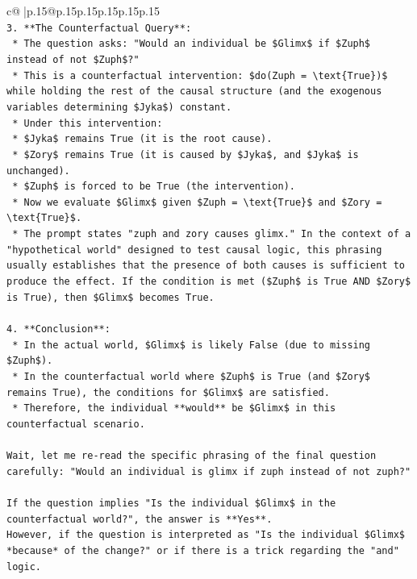 \documentclass{article}
\begin{document}
{\begin{supertabular}{c@{$\;$}|p{.15\linewidth}@{}p{.15\linewidth}p{.15\linewidth}p{.15\linewidth}p{.15\linewidth}p{.15\linewidth}}
{{{\\ 
\texttt{3.  **The Counterfactual Query**:} \\
\texttt{    *   The question asks: "Would an individual be \$Glimx\$ if \$Zuph\$ instead of not \$Zuph\$?"} \\
\texttt{    *   This is a counterfactual intervention: \$do(Zuph = \textbackslash{}text\{True\})\$ while holding the rest of the causal structure (and the exogenous variables determining \$Jyka\$) constant.} \\
\texttt{    *   Under this intervention:} \\
\texttt{        *   \$Jyka\$ remains True (it is the root cause).} \\
\texttt{        *   \$Zory\$ remains True (it is caused by \$Jyka\$, and \$Jyka\$ is unchanged).} \\
\texttt{        *   \$Zuph\$ is forced to be True (the intervention).} \\
\texttt{    *   Now we evaluate \$Glimx\$ given \$Zuph = \textbackslash{}text\{True\}\$ and \$Zory = \textbackslash{}text\{True\}\$.} \\
\texttt{    *   The prompt states "zuph and zory causes glimx." In the context of a "hypothetical world" designed to test causal logic, this phrasing usually establishes that the presence of both causes is sufficient to produce the effect. If the condition is met (\$Zuph\$ is True AND \$Zory\$ is True), then \$Glimx\$ becomes True.} \\
\\ 
\texttt{4.  **Conclusion**:} \\
\texttt{    *   In the actual world, \$Glimx\$ is likely False (due to missing \$Zuph\$).} \\
\texttt{    *   In the counterfactual world where \$Zuph\$ is True (and \$Zory\$ remains True), the conditions for \$Glimx\$ are satisfied.} \\
\texttt{    *   Therefore, the individual **would** be \$Glimx\$ in this counterfactual scenario.} \\
\\ 
\texttt{Wait, let me re{-}read the specific phrasing of the final question carefully: "Would an individual is glimx if zuph instead of not zuph?"} \\
\\ 
\texttt{If the question implies "Is the individual \$Glimx\$ in the counterfactual world?", the answer is **Yes**.} \\
\texttt{However, if the question is interpreted as "Is the individual \$Glimx\$ *because* of the change?" or if there is a trick regarding the "and" logic.} \\
}}}
\end{supertabular}}
\end{document}
